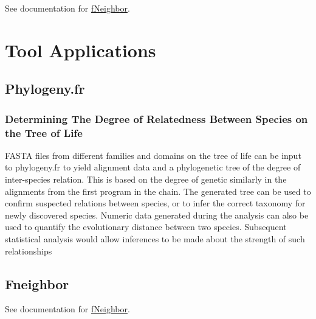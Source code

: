     See documentation for \href{http://bioinfo.nhri.org.tw/cgi-bin/emboss/help/fneighbor}{fNeighbor}. 

\section{Tool Applications}

    \subsection{Phylogeny.fr}

        \subsubsection{Determining The Degree of Relatedness Between Species on the Tree of Life}

        FASTA files from different families and domains on the tree of life can be input to phylogeny.fr to yield alignment data and a phylogenetic tree of the degree of inter-species relation.\autocite{L5} This is based on the degree of genetic similarly in the alignments from the first program in the chain. The generated tree can be used to confirm suspected relations between species, or to infer the correct taxonomy for newly discovered species. Numeric data generated during the analysis can also be used to quantify the evolutionary distance between two species. Subsequent statistical analysis would allow inferences to be made about the strength of such relationships

    \subsection{Fneighbor}

    See documentation for \href{http://bioinfo.nhri.org.tw/cgi-bin/emboss/help/fneighbor}{fNeighbor}.